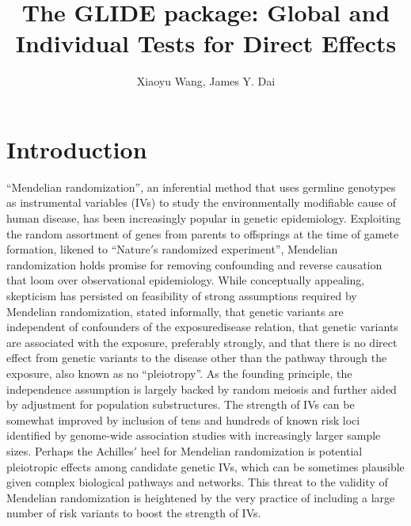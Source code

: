 \documentclass[12pt]{article}
\newcommand{\Rpackage}[1]{\textsf{#1}}
\begin{document}















\title{The \Rpackage{GLIDE} package: Global and Individual Tests for Direct Effects}
\author{Xiaoyu Wang, James Y. Dai}
\maketitle

\section{Introduction}

``Mendelian randomization'', an inferential method that uses germline genotypes as instrumental variables (IVs) to study the environmentally modifiable cause of human disease, has been increasingly popular in genetic epidemiology. Exploiting the random assortment of genes from parents to offsprings at the time of gamete formation, likened to ``Nature$\prime$s randomized experiment'', Mendelian randomization holds promise for removing confounding and reverse causation that loom over observational epidemiology. While conceptually appealing, skepticism has persisted on feasibility of strong assumptions required by Mendelian randomization, stated informally, that genetic variants are independent of confounders of the exposuredisease relation, that genetic variants are associated with the exposure, preferably strongly, and that there is no direct effect from genetic variants to the disease other than the pathway through the exposure, also known as no ``pleiotropy''. As the founding principle, the independence assumption is largely backed by random meiosis and further aided by adjustment for population substructures. The strength of IVs can be somewhat improved by inclusion of tens and hundreds of known risk loci identified by genome-wide association studies with increasingly larger sample sizes. Perhaps the Achilles$\prime$ heel for Mendelian randomization is potential pleiotropic effects among candidate genetic IVs, which can be sometimes plausible given complex biological pathways and networks. This threat to the validity of Mendelian randomization is heightened by the very practice of including a large number of risk variants to boost the strength of IVs.
\end{document}
